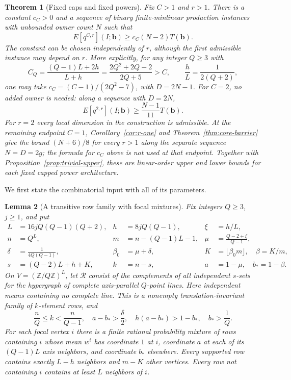 \documentclass[11pt]{article}
\newtheorem{theorem}{Theorem}[section]
\newtheorem{lemma}[theorem]{Lemma}
\theoremstyle{definition}
\theoremstyle{remark}
\begin{document}
\begin{theorem}[Fixed caps and fixed powers]
\label{thm:fixed-cap}
Fix $C>1$ and $r>1$.  There is a constant $c_C>0$ and a sequence of
binary finite-minlinear production instances with unbounded owner count
$N$ such that
\[
 E[q^{C,r}](I;\mathbf b)\ge c_C(N-2)T(\mathbf b).
\]
The constant can be chosen independently of $r$, although the first
admissible instance may depend on $r$.  More explicitly, for any integer
$Q\ge3$ with
\begin{equation}
 C_Q=\frac{(Q-1)L+2h}{L+h}
     =\frac{2Q^2+2Q-2}{2Q+5}>C,
 \qquad \frac hL=\frac1{2(Q+2)},
 \label{eq:natural-cap}
\end{equation}
one may take $c_C=(C-1)/(2Q^2-7)$, with $D=2N-1$.
For $C=2$, no added owner is needed: along a sequence with $D=2N$,
\begin{equation}
 E[q^{2,r}](I;\mathbf b)\ge\frac{N-1}{11}T(\mathbf b).
 \label{eq:cap-two-eleventh}
\end{equation}
For $r=2$ every local dimension in the construction is admissible.
At the remaining endpoint $C=1$, Corollary~\ref{cor:r-one} and
Theorem~\ref{thm:core-barrier} give the bound $(N+6)/8$ for every $r>1$
along the separate sequence $N=D=2g$; the formula for $c_C$ above is
not used at that endpoint.
Together with Proposition~\ref{prop:trivial-upper}, these are linear-order
upper and lower bounds for each fixed capped power architecture.
\end{theorem}

We first state the combinatorial input with all of its parameters.

\begin{lemma}[A transitive row family with focal mixtures]
\label{lem:qary-input}
Fix integers $Q\ge3$, $j\ge1$, and put
\begin{align*}
 L&=16jQ(Q-1)(Q+2),& h&=8jQ(Q-1),& \xi&=h/L,\\
 n&=Q^L,& m&=n-(Q-1)L-1,&
 \mu&=\frac{Q-2+\xi}{Q-1},\\
 \delta&=\frac1{4Q(Q-1)},& \beta_0&=\mu+\delta,&
 K&=\lfloor\beta_0m\rfloor,\quad \beta=K/m,\\
 s&=(Q-2)L+h+K,& k&=n-s,& a&=1-\mu,\quad b_*=1-\beta.
\end{align*}
On $V=(\mathbb Z/Q\mathbb Z)^L$, let $\mathcal R$ consist of the
complements of all independent $s$-sets for the hypergraph of complete
axis-parallel $Q$-point lines.  Here independent means containing no
complete line.  This is a nonempty translation-invariant family of
$k$-element rows, and
\begin{equation}
 \frac nQ\le k<\frac n{Q-1},\quad
 a-b_*>\frac\delta2,\quad
 h(a-b_*)>1-b_*,\quad b_*>\frac1Q.
 \label{eq:qary-margins}
\end{equation}
For each focal vertex $i$ there is a finite rational probability mixture
of rows containing $i$ whose mean $w^i$ has coordinate $1$ at $i$,
coordinate $a$ at each of its $(Q-1)L$ axis neighbors, and coordinate
$b_*$ elsewhere.  Every supported row contains exactly $L-h$ neighbors
and $m-K$ other vertices.  Every row not containing $i$ contains at least
$L$ neighbors of $i$.
\end{lemma}
\end{document}
